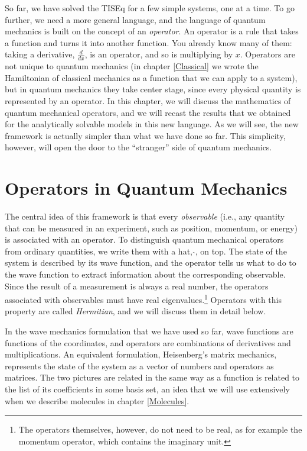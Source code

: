 \documentclass[
  english,
  9pt,
]{extbook}
\theoremstyle{definition}
\theoremstyle{definition}
\theoremstyle{definition}
\theoremstyle{definition}
\theoremstyle{remark}
\begin{document}
So far, we have solved the TISEq for a few simple systems, one at a time. To go further, we need a more general language, and the language of quantum mechanics is built on the concept of an \emph{operator}. An operator is a rule that takes a function and turns it into another function. You already know many of them: taking a derivative, \(\frac{d}{dx}\), is an operator, and so is multiplying by \(x\). Operators are not unique to quantum mechanics (in chapter \ref{Classical} we wrote the Hamiltonian of classical mechanics as a function that we can apply to a system), but in quantum mechanics they take center stage, since every physical quantity is represented by an operator. In this chapter, we will discuss the mathematics of quantum mechanical operators, and we will recast the results that we obtained for the analytically solvable models in this new language. As we will see, the new framework is actually simpler than what we have done so far. This simplicity, however, will open the door to the ``stranger'' side of quantum mechanics.

\section{Operators in Quantum Mechanics}\label{operators-in-quantum-mechanics}

The central idea of this framework is that every \emph{observable} (i.e., any quantity that can be measured in an experiment, such as position, momentum, or energy) is associated with an operator. To distinguish quantum mechanical operators from ordinary quantities, we write them with a hat, \(\hat{}\), on top. The state of the system is described by its wave function, and the operator tells us what to do to the wave function to extract information about the corresponding observable. Since the result of a measurement is always a real number, the operators associated with observables must have real eigenvalues.\footnote{The operators themselves, however, do not need to be real, as for example the momentum operator, which contains the imaginary unit.} Operators with this property are called \emph{Hermitian}, and we will discuss them in detail below.

In the wave mechanics formulation that we have used so far, wave functions are functions of the coordinates, and operators are combinations of derivatives and multiplications. An equivalent formulation, Heisenberg's matrix mechanics, represents the state of the system as a vector of numbers and operators as matrices. The two pictures are related in the same way as a function is related to the list of its coefficients in some basis set, an idea that we will use extensively when we describe molecules in chapter \ref{Molecules}.
\end{document}

